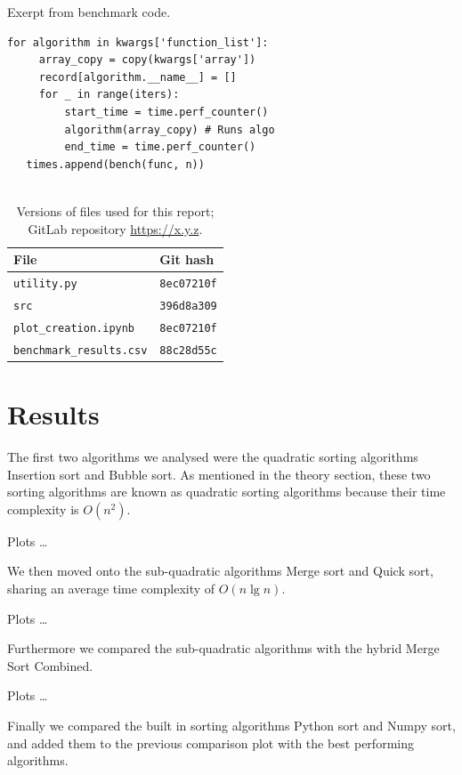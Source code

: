 \documentclass[sigconf, nonacm, natbib, screen, balance=False]{acmart}
\begin{document}
\begin{listing}
  \caption{Exerpt from benchmark code.}
  \label{lst:bench_setup}
  \begin{lstlisting}
for algorithm in kwargs['function_list']:
     array_copy = copy(kwargs['array'])
     record[algorithm.__name__] = []
     for _ in range(iters):
         start_time = time.perf_counter()
         algorithm(array_copy) # Runs algo
         end_time = time.perf_counter()
   times.append(bench(func, n))
   
  \end{lstlisting}
\end{listing}

\begin{table}
  \caption{Versions of files used for this report; GitLab repository
    \url{https://x.y.z}.}
  \label{tab:hashes}
  \begin{tabular}{ll}
    \hline
    File & Git hash \\\hline
    \verb!utility.py! & \verb!8ec07210f! \\
    \verb!src! & \verb!396d8a309! \\
    \verb!plot_creation.ipynb! & \verb!8ec07210f! \\
    \verb!benchmark_results.csv! & \verb!88c28d55c! \\\hline
  \end{tabular}
\end{table}

\section{Results}\label{sec:results}

The first two algorithms we analysed were the quadratic sorting algorithms Insertion sort and Bubble sort. As mentioned in the theory section, these two sorting algorithms are known as quadratic sorting algorithms because their time complexity is $O(n^2)$.
 
Plots \dots

We then moved onto the sub-quadratic algorithms Merge sort and Quick sort, sharing an average time complexity of $O(n\lg n)$. 

Plots \dots

Furthermore we compared the sub-quadratic algorithms with the hybrid Merge Sort Combined.

Plots \dots

Finally we compared the built in sorting algorithms Python sort and Numpy sort, and added them to the previous comparison plot with the best performing algorithms. 
\end{document}
